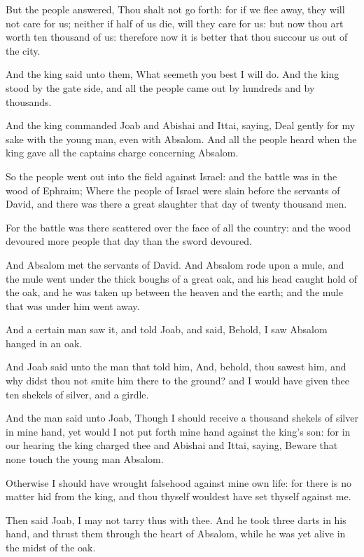 \Verse But the people answered, Thou shalt not go forth: for if we flee away, they will not care for us; neither if half of us die, will they care for us: but now thou art worth ten thousand of us: therefore now it is better that thou succour us out of the city.

\Verse And the king said unto them, What seemeth you best I will do. And the king stood by the gate side, and all the people came out by hundreds and by thousands.

\Verse And the king commanded Joab and Abishai and Ittai, saying, Deal gently for my sake with the young man, even with Absalom. And all the people heard when the king gave all the captains charge concerning Absalom.

\Verse So the people went out into the field against Israel: and the battle was in the wood of Ephraim; \Verse Where the people of Israel were slain before the servants of David, and there was there a great slaughter that day of twenty thousand men.

\Verse For the battle was there scattered over the face of all the country: and the wood devoured more people that day than the sword devoured.

\Verse And Absalom met the servants of David. And Absalom rode upon a mule, and the mule went under the thick boughs of a great oak, and his head caught hold of the oak, and he was taken up between the heaven and the earth; and the mule that was under him went away.

\Verse And a certain man saw it, and told Joab, and said, Behold, I saw Absalom hanged in an oak.

\Verse And Joab said unto the man that told him, And, behold, thou sawest him, and why didst thou not smite him there to the ground? and I would have given thee ten shekels of silver, and a girdle.

\Verse And the man said unto Joab, Though I should receive a thousand shekels of silver in mine hand, yet would I not put forth mine hand against the king's son: for in our hearing the king charged thee and Abishai and Ittai, saying, Beware that none touch the young man Absalom.

\Verse Otherwise I should have wrought falsehood against mine own life: for there is no matter hid from the king, and thou thyself wouldest have set thyself against me.

\Verse Then said Joab, I may not tarry thus with thee. And he took three darts in his hand, and thrust them through the heart of Absalom, while he was yet alive in the midst of the oak.

